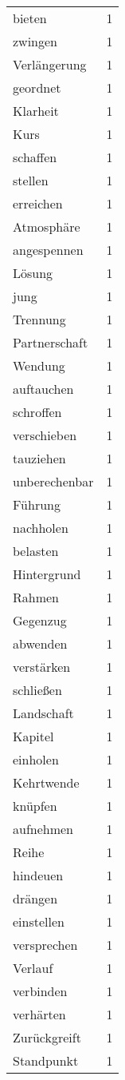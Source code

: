 \begin{tabular}{lr}
bieten & 1 \\
zwingen & 1 \\
Verlängerung & 1 \\
geordnet & 1 \\
Klarheit & 1 \\
Kurs & 1 \\
schaffen & 1 \\
stellen & 1 \\
erreichen & 1 \\
Atmosphäre & 1 \\
angespennen & 1 \\
Lösung & 1 \\
jung & 1 \\
Trennung & 1 \\
Partnerschaft & 1 \\
Wendung & 1 \\
auftauchen & 1 \\
schroffen & 1 \\
verschieben & 1 \\
tauziehen & 1 \\
unberechenbar & 1 \\
Führung & 1 \\
nachholen & 1 \\
belasten & 1 \\
Hintergrund & 1 \\
Rahmen & 1 \\
Gegenzug & 1 \\
abwenden & 1 \\
verstärken & 1 \\
schließen & 1 \\
Landschaft & 1 \\
Kapitel & 1 \\
einholen & 1 \\
Kehrtwende & 1 \\
knüpfen & 1 \\
aufnehmen & 1 \\
Reihe & 1 \\
hindeuen & 1 \\
drängen & 1 \\
einstellen & 1 \\
versprechen & 1 \\
Verlauf & 1 \\
verbinden & 1 \\
verhärten & 1 \\
Zurückgreift & 1 \\
Standpunkt & 1 \\

\end{tabular}
